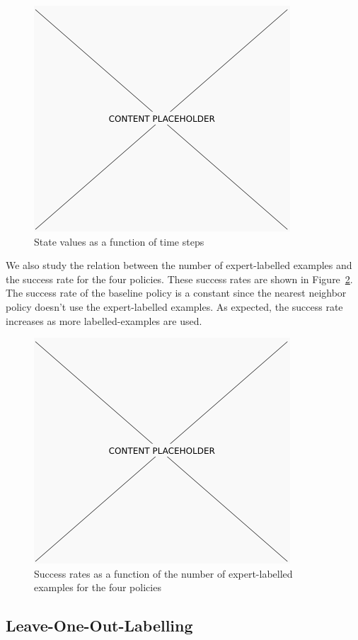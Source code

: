 \begin{figure}[h!]
  \centering
    \includegraphics[width=0.9\linewidth]{figures/placeholder.png}
  \caption{State values as a function of time steps}
  \label{fig:values}
\end{figure}

We also study the relation between the number of expert-labelled examples and the success rate for the four policies.
These success rates are shown in Figure~\ref{fig:number_examples}.
The success rate of the baseline policy is a constant since the nearest neighbor policy doesn't use the expert-labelled examples.
As expected, the success rate increases as more labelled-examples are used.

\begin{figure}[h!]
  \centering
    \includegraphics[width=0.9\linewidth]{figures/placeholder.png}
  \caption{Success rates as a function of the number of expert-labelled examples for the four policies}
  \label{fig:number_examples}
\end{figure}

\subsection{Leave-One-Out-Labelling}

